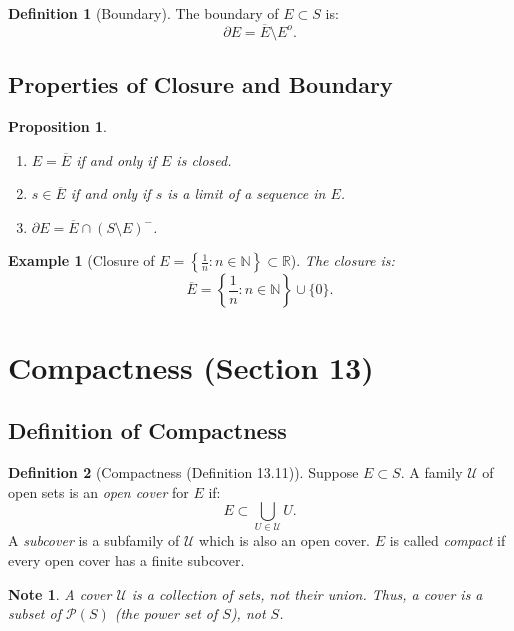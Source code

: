 \documentclass[9pt]{article}
\theoremstyle{definition}
\newtheorem{definition}{Definition}
\theoremstyle{plain}
\newtheorem{proposition}{Proposition}
\newtheorem{example}{Example}
\newtheorem{note}{Note}
\begin{document}
\begin{definition}[Boundary]
The boundary of \( E \subset S \) is:
\[
\partial E = \overline{E} \setminus E^o.
\]
\end{definition}

\subsection*{Properties of Closure and Boundary}
\begin{proposition}
\leavevmode
\begin{enumerate}
    \item \( E = \overline{E} \) if and only if \( E \) is closed.
    \item \( s \in \overline{E} \) if and only if \( s \) is a limit of a sequence in \( E \).
    \item \( \partial E = \overline{E} \cap (S \setminus E)^- \).
\end{enumerate}
\end{proposition}

\begin{example}[Closure of \( E = \left\{\frac{1}{n} : n \in \mathbb{N}\right\} \subset \mathbb{R} \)]
The closure is:
\[
\overline{E} = \left\{\frac{1}{n} : n \in \mathbb{N}\right\} \cup \{0\}.
\]
\end{example}
\section*{Compactness (Section 13)}

\subsection*{Definition of Compactness}
\begin{definition}[Compactness (Definition 13.11)]
Suppose \( E \subset S \). A family \( \mathcal{U} \) of open sets is an \textit{open cover} for \( E \) if:
\[
E \subset \bigcup_{U \in \mathcal{U}} U.
\]
A \textit{subcover} is a subfamily of \( \mathcal{U} \) which is also an open cover. \( E \) is called \textit{compact} if every open cover has a finite subcover.
\end{definition}

\begin{note}
A cover \( \mathcal{U} \) is a collection of sets, not their union. Thus, a cover is a subset of \( \mathcal{P}(S) \) (the power set of \( S \)), not \( S \).
\end{note}
\end{document}
